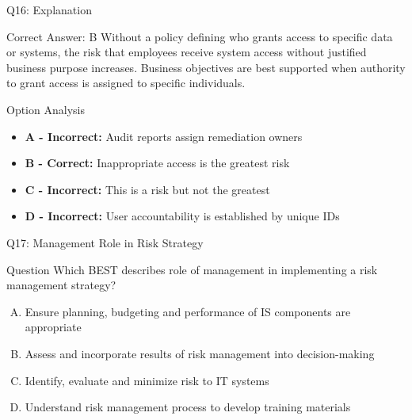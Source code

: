\documentclass{beamer}
\begin{document}
	\begin{frame}{Q16: Explanation}
		\begin{block}{Correct Answer: B}
			Without a policy defining who grants access to specific data or systems, the risk that employees receive system access without justified business purpose increases. Business objectives are best supported when authority to grant access is assigned to specific individuals.
		\end{block}
		\begin{block}{Option Analysis}
			\begin{itemize}
				\item \textbf{A - Incorrect:} Audit reports assign remediation owners
				\item \textbf{B - Correct:} Inappropriate access is the greatest risk
				\item \textbf{C - Incorrect:} This is a risk but not the greatest
				\item \textbf{D - Incorrect:} User accountability is established by unique IDs
			\end{itemize}
		\end{block}
	\end{frame}
	
	\begin{frame}{Q17: Management Role in Risk Strategy}
		\begin{block}{Question}
			Which BEST describes role of management in implementing a risk management strategy?
		\end{block}
		\begin{enumerate}[(A)]
			\item Ensure planning, budgeting and performance of IS components are appropriate
			\item Assess and incorporate results of risk management into decision-making
			\item Identify, evaluate and minimize risk to IT systems
			\item Understand risk management process to develop training materials
		\end{enumerate}
	\end{frame}
	
\end{document}
